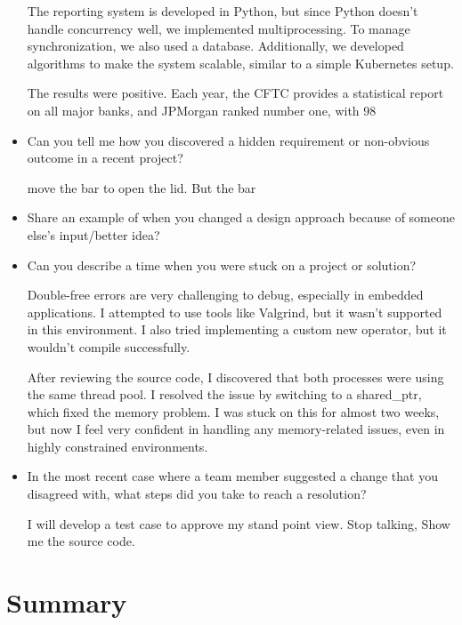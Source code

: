 \documentclass[a4paper,11pt,twoside]{book}
\begin{document}
\begin{itemize}
	The reporting system is developed in Python, but since Python doesn’t handle concurrency well, we implemented multiprocessing. To manage synchronization, we also used a database. Additionally, we developed algorithms to make the system scalable, similar to a simple Kubernetes setup.
	
	The results were positive. Each year, the CFTC provides a statistical report on all major banks, and JPMorgan ranked number one, with 98%
	
	\item Can you tell me how you discovered a hidden requirement or non-obvious outcome in a recent project?
	
	move the bar to open the lid. But the bar 
	
	\item Share an example of when you changed a design approach because of someone else’s input/better idea?
	
	
	
	
	\item Can you describe a time when you were stuck on a project or solution?
	
	Double-free errors are very challenging to debug, especially in embedded applications. I attempted to use tools like Valgrind, but it wasn’t supported in this environment. I also tried implementing a custom new operator, but it wouldn’t compile successfully.
	
	After reviewing the source code, I discovered that both processes were using the same thread pool. I resolved the issue by switching to a shared\_ptr, which fixed the memory problem. I was stuck on this for almost two weeks, but now I feel very confident in handling any memory-related issues, even in highly constrained environments.
	
	
	\item In the most recent case where a team member suggested a change that you disagreed with, what steps did
	you take to reach a resolution?
	
	I will develop a test case to approve my stand point view. Stop talking, Show me the source code. 
	
\end{itemize}

\iffalse

\chapter{Summary}
\end{document}

